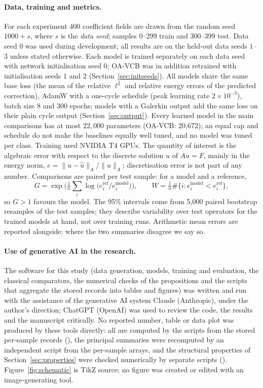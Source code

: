 \paragraph{Data, training and metrics.} For each experiment 400 coefficient fields are drawn from the random seed $1000+s$,
where $s$ is the \emph{data seed}; samples $0$--$299$ train and $300$--$399$ test. Data seed $0$ was used during development;
all results are on the held-out data seeds $1$--$3$ unless stated otherwise. Each model is trained separately on each data
seed with network initialisation seed $0$; OA-VCB was in addition retrained with initialisation seeds $1$ and $2$
(Section~\ref{sec:initseeds}). All models share the same base loss (the mean of the relative $\ell^2$ and relative energy
errors of the predicted correction), AdamW with a one-cycle schedule (peak learning rate $2\times10^{-3}$), batch size 8 and
300 epochs; models with a Galerkin output add the same loss on their plain cycle output (Section~\ref{sec:output}). Every
learned model in the main comparisons has at most $22{,}000$ parameters (OA-VCB: 20{,}672); an equal cap and schedule do not
make the baselines equally well tuned, and no model was tuned per class. Training used NVIDIA T4 GPUs. The quantity of
interest is the algebraic error with respect to the discrete solution $u$ of $Au=F$, mainly in the energy norm,
$e = \|u - \hat u\|_A/\|u\|_A$; discretisation error is not part of any number. Comparisons are paired per test sample: for a
model and a reference,
\[
  G = \exp\Big(\tfrac1n\textstyle\sum_i \log\big(e^{\mathrm{ref}}_i/e^{\mathrm{model}}_i\big)\Big),\qquad
  W = \tfrac1n\#\{i: e^{\mathrm{model}}_i<e^{\mathrm{ref}}_i\},
\]
so $G>1$ favours the model. The 95\% intervals come from 5{,}000 paired bootstrap resamples of the test samples; they
describe variability over test operators for the trained models at hand, not over training runs. Arithmetic mean errors are
reported alongside; where the two summaries disagree we say so.

\paragraph{Use of generative AI in the research.} The software for this study (data generation, models, training and
evaluation, the classical comparators, the numerical checks of the propositions and the scripts that aggregate the stored
records into tables and figures) was written and run with the assistance of the generative AI system Claude (Anthropic),
under the author's direction; ChatGPT (OpenAI) was used to review the code, the results and the manuscript critically. No
reported number, table or data plot was produced by these tools directly: all are computed by the scripts from the stored
per-sample records (), the principal summaries were recomputed by an independent script from the
per-sample arrays, and the structural properties of Section~\ref{sec:properties} were checked numerically by separate
scripts (). Figure~\ref{fig:schematic} is TikZ source; no figure was created or edited with an image-generating
tool.

